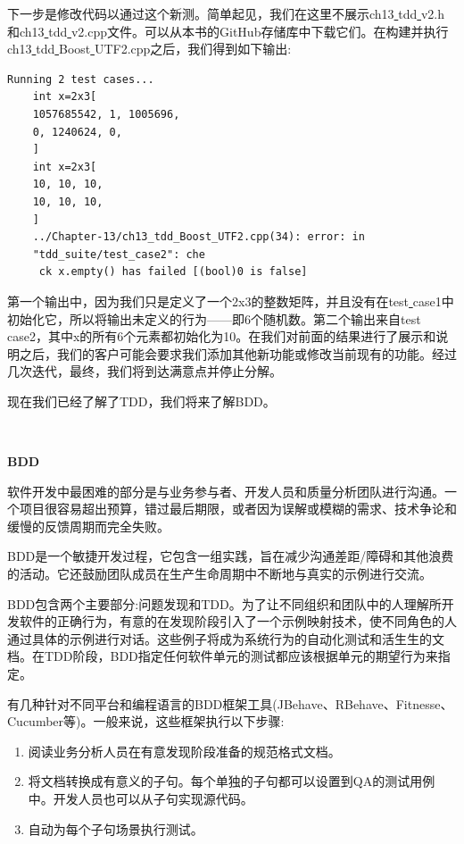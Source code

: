 下一步是修改代码以通过这个新测。简单起见，我们在这里不展示ch13\underline{ }tdd\underline{ }v2.h和ch13\underline{ }tdd\underline{ }v2.cpp文件。可以从本书的GitHub存储库中下载它们。在构建并执行ch13\underline{ }tdd\underline{ }Boost\underline{ }UTF2.cpp之后，我们得到如下输出: \par

\begin{lstlisting}[caption={}]
Running 2 test cases...
	int x=2x3[
	1057685542, 1, 1005696,
	0, 1240624, 0,
	]
	int x=2x3[
	10, 10, 10,
	10, 10, 10,
	]
	../Chapter-13/ch13_tdd_Boost_UTF2.cpp(34): error: in
	"tdd_suite/test_case2": che
	 ck x.empty() has failed [(bool)0 is false]
\end{lstlisting}

第一个输出中，因为我们只是定义了一个2x3的整数矩阵，并且没有在test\underline{ }case1中初始化它，所以将输出未定义的行为——即6个随机数。第二个输出来自test\underline{ }case2，其中x的所有6个元素都初始化为10。在我们对前面的结果进行了展示和说明之后，我们的客户可能会要求我们添加其他新功能或修改当前现有的功能。经过几次迭代，最终，我们将到达满意点并停止分解。 \par
现在我们已经了解了TDD，我们将来了解BDD。 \par

\noindent\textbf{}\ \par
\textbf{BDD} \ \par
软件开发中最困难的部分是与业务参与者、开发人员和质量分析团队进行沟通。一个项目很容易超出预算，错过最后期限，或者因为误解或模糊的需求、技术争论和缓慢的反馈周期而完全失败。 \par
BDD是一个敏捷开发过程，它包含一组实践，旨在减少沟通差距/障碍和其他浪费的活动。它还鼓励团队成员在生产生命周期中不断地与真实的示例进行交流。 \par
BDD包含两个主要部分:问题发现和TDD。为了让不同组织和团队中的人理解所开发软件的正确行为，有意的在发现阶段引入了一个示例映射技术，使不同角色的人通过具体的示例进行对话。这些例子将成为系统行为的自动化测试和活生生的文档。在TDD阶段，BDD指定任何软件单元的测试都应该根据单元的期望行为来指定。 \par
有几种针对不同平台和编程语言的BDD框架工具(JBehave、RBehave、Fitnesse、Cucumber等)。一般来说，这些框架执行以下步骤: \par

\begin{enumerate}
	\item 阅读业务分析人员在有意发现阶段准备的规范格式文档。
	\item 将文档转换成有意义的子句。每个单独的子句都可以设置到QA的测试用例中。开发人员也可以从子句实现源代码。
	\item 自动为每个子句场景执行测试。
\end{enumerate}

